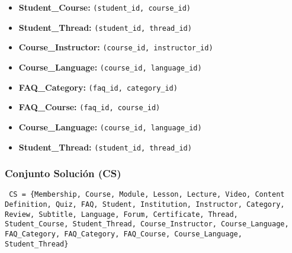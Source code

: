 \documentclass[../main.tex]{subfiles}
\begin{document}
\begin{itemize}
  \item \textbf{Student\_Course:} \texttt{(student\_id, course\_id)}
  \item \textbf{Student\_Thread:} \texttt{(student\_id, thread\_id)}
  \item \textbf{Course\_Instructor:} \texttt{(course\_id, instructor\_id)}
  \item \textbf{Course\_Language:} \texttt{(course\_id, language\_id)}
  \item \textbf{FAQ\_Category:} \texttt{(faq\_id, category\_id)}
  \item \textbf{FAQ\_Course:} \texttt{(faq\_id, course\_id)}
  \item \textbf{Course\_Language:} \texttt{(course\_id, language\_id)}
  \item \textbf{Student\_Thread:} \texttt{(student\_id, thread\_id)}
\end{itemize}

\subsubsection{Conjunto Solución (CS)}

\begin{flushleft}
  \texttt{%
    CS = \{Membership, Course, Module, Lesson, Lecture, Video,
    Content Definition, Quiz, FAQ, Student, Institution,
    Instructor, Category, Review, Subtitle, Language, Forum,
    Certificate, Thread, Student\_Course, Student\_Thread,
    Course\_Instructor, Course\_Language, FAQ\_Category,
    FAQ\_Category, FAQ\_Course, Course\_Language, Student\_Thread\}
  }
\end{flushleft}
\end{document}
